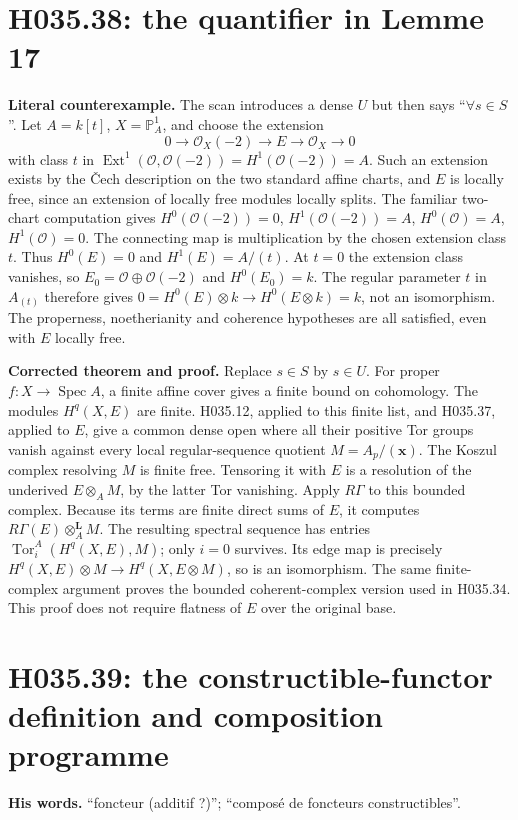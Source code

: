 \section{H035.38: the quantifier in Lemme 17}
\textbf{Literal counterexample.} The scan introduces a dense $U$
but then says ``$\forall s\in S$''. Let $A=k[t]$,
$X=\mathbb P^1_A$, and choose the extension
\[
 0\longrightarrow\mathcal O_X(-2)\longrightarrow E
 \longrightarrow\mathcal O_X\longrightarrow0
\]
with class $t$ in $\operatorname{Ext}^1(\mathcal O,\mathcal O(-2))
=H^1(\mathcal O(-2))=A$. Such an extension exists by the
Čech description on the two standard affine charts, and $E$ is
locally free, since an extension of locally free modules locally
splits. The familiar two-chart computation gives
$H^0(\mathcal O(-2))=0$, $H^1(\mathcal O(-2))=A$,
$H^0(\mathcal O)=A$, $H^1(\mathcal O)=0$. The connecting map
is multiplication by the chosen extension class $t$. Thus
$H^0(E)=0$ and $H^1(E)=A/(t)$. At $t=0$ the extension class
vanishes, so $E_0=\mathcal O\oplus\mathcal O(-2)$ and
$H^0(E_0)=k$. The regular parameter $t$ in $A_{(t)}$ therefore
gives $0=H^0(E)\otimes k\to H^0(E\otimes k)=k$, not an
isomorphism. The properness, noetherianity and coherence hypotheses
are all satisfied, even with $E$ locally free.

\textbf{Corrected theorem and proof.} Replace $s\in S$ by
$s\in U$. For proper $f:X\to\operatorname{Spec}A$, a finite
affine cover gives a finite bound on cohomology. The modules
$H^q(X,E)$ are finite. H035.12, applied to this finite list,
and H035.37, applied to $E$, give a common dense open where
all their positive Tor groups vanish against every local
regular-sequence quotient $M=A_p/(\mathbf x)$.
The Koszul complex resolving $M$ is finite free. Tensoring it
with $E$ is a resolution of the underived $E\otimes_A M$,
by the latter Tor vanishing. Apply $R\Gamma$ to this bounded
complex. Because its terms are finite direct sums of $E$, it
computes $R\Gamma(E)\otimes_A^{\mathbf L}M$. The resulting
spectral sequence has entries
$\operatorname{Tor}_i^A(H^q(X,E),M)$; only $i=0$ survives.
Its edge map is precisely
$H^q(X,E)\otimes M\to H^q(X,E\otimes M)$, so is an
isomorphism. The same finite-complex argument proves the
bounded coherent-complex version used in H035.34. This proof
does not require flatness of $E$ over the original base.

\section{H035.39: the constructible-functor definition and composition programme}
\textbf{His words.} ``foncteur (additif ?)''; ``composé de foncteurs
constructibles''.

